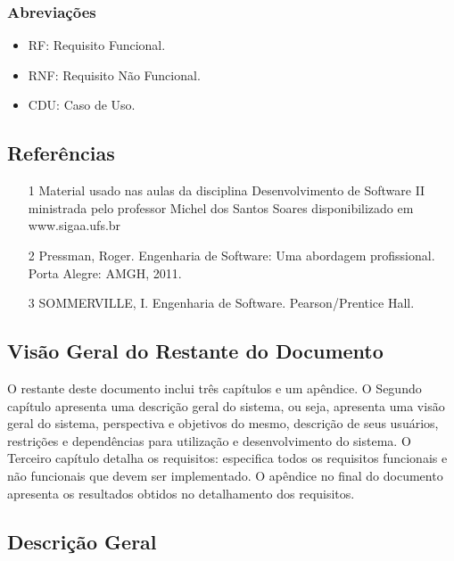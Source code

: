 	\subsubsection{Abreviações}
	\begin{itemize}
	\item RF: Requisito Funcional.
	\item RNF: Requisito Não Funcional.
	\item CDU: Caso de Uso.
	\end{itemize}



\subsection{Referências}

	\begin{itemize}
		\item[1]  Material usado nas aulas da disciplina Desenvolvimento de Software II ministrada pelo professor Michel dos Santos Soares disponibilizado em www.sigaa.ufs.br 
		\item[2] Pressman, Roger. Engenharia de Software: Uma abordagem profissional. Porta Alegre: AMGH, 2011.		
		\item[3] SOMMERVILLE, I. Engenharia de Software. Pearson/Prentice Hall.
	\end{itemize}

\subsection{Visão Geral do Restante do Documento}

O restante deste documento inclui três capítulos e um apêndice. O Segundo capítulo apresenta uma  descrição geral do sistema, ou seja, apresenta uma visão geral do sistema, perspectiva e objetivos do mesmo, descrição de seus usuários,   restrições e dependências  para utilização e desenvolvimento do sistema. 
O Terceiro capítulo detalha os requisitos: especifica todos os requisitos funcionais e não funcionais que devem  ser implementado.
O apêndice no final do documento apresenta os resultados obtidos no detalhamento dos requisitos.

\subsection{Descrição Geral}

